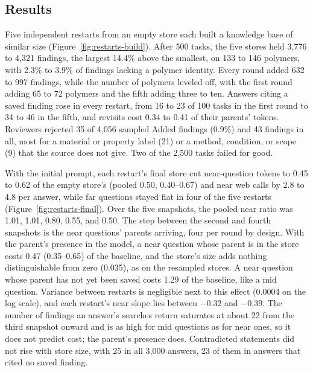 \documentclass[journal=mamobx,manuscript=suppinfo]{achemso}
\begin{document}
\subsection{Results}

Five independent restarts from an empty store each built a knowledge base of similar size (Figure~\ref{fig:restarts-build}).
After 500 tasks, the five stores held 3,776 to 4,321 findings, the largest 14.4\% above the smallest, on 133 to 146 polymers, with 2.3\% to 3.9\% of findings lacking a polymer identity.
Every round added 632 to 997 findings, while the number of polymers leveled off, with the first round adding 65 to 72 polymers and the fifth adding three to ten.
Answers citing a saved finding rose in every restart, from 16 to 23 of 100 tasks in the first round to 34 to 46 in the fifth, and revisits cost 0.34 to 0.41 of their parents' tokens.
Reviewers rejected 35 of 4,056 sampled Added findings (0.9\%) and 43 findings in all, most for a material or property label (21) or a method, condition, or scope (9) that the source does not give.
Two of the 2,500 tasks failed for good.

With the initial prompt, each restart's final store cut near-question tokens to 0.45 to 0.62 of the empty store's (pooled 0.50, 0.40--0.67) and near web calls by 2.8 to 4.8 per answer, while far questions stayed flat in four of the five restarts (Figure~\ref{fig:restarts-final}).
Over the five snapshots, the pooled near ratio was 1.01, 1.01, 0.80, 0.55, and 0.50.
The step between the second and fourth snapshots is the near questions' parents arriving, four per round by design.
With the parent's presence in the model, a near question whose parent is in the store costs 0.47 (0.35--0.65) of the baseline, and the store's size adds nothing distinguishable from zero (0.035), as on the resampled stores.
A near question whose parent has not yet been saved costs 1.29 of the baseline, like a mid question.
Variance between restarts is negligible next to this effect (0.0004 on the log scale), and each restart's near slope lies between $-0.32$ and $-0.39$.
The number of findings an answer's searches return saturates at about 22 from the third snapshot onward and is as high for mid questions as for near ones, so it does not predict cost; the parent's presence does.
Contradicted statements did not rise with store size, with 25 in all 3,000 answers, 23 of them in answers that cited no saved finding.
\end{document}
